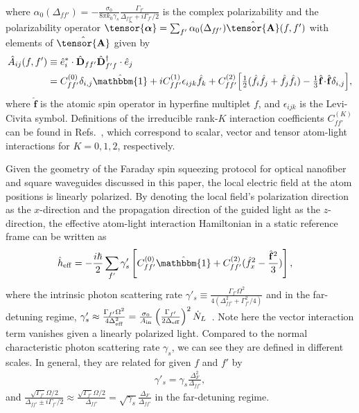 \documentclass[preprint,aps,pra,onecolumn,superscriptaddress]{revtex4-1} %
\newcommand{\smallfrac}[2]{\mbox{$\frac{#1}{#2}$}}
\newcommand{\poltens}{\hat{\tensor{\boldsymbol{\alpha}}}}
\newcommand{\charpol}{\alpha_0(\Delta_{f\!f'})}
\newcommand{\Ain}{A_{\rm in}}
\begin{document}
\begin{appendix}
\begin{align}
\end{align}
where $\charpol = -\frac{\sigma_0}{8\pi k_0\gamma_s}\frac{\Gamma_{f'}}{\Delta_{ff'}+i\Gamma_{f'}/2}$ is the complex polarizability and the polarizability operator $  \poltens=\sum_{f'}\charpol\hat{\tensor{\mathbf{A}}}(f,f')$ with elements of $ \hat{\tensor{\mathbf{A}}} $ given by
\begin{align} \label{Eq::PolarizabilityIrrep}
		\hat{A}_{ij}(f,f')&\equiv \hat{e}_i^*\cdot\hat{\mathbf{D}}_{ff'}\hat{\mathbf{D}}_{f'f}^\dagger \cdot \hat{e}_j \\
		&=  C_{ff'}^{(0)} \delta_{i,j}\hat{\mathbbm{1}}+ iC_{ff'}^{(1)}\epsilon_{ijk}\hat{f}_k+ C_{ff'}^{(2)} \Big[ \smallfrac{1}{2} ( \hat{f}_i\hat{f}_j +\hat{f}_j\hat{f}_i )-\smallfrac{1}{3} \hat{\mathbf{f}}\!\cdot\!\hat{\mathbf{f}} \delta_{i,j} \Big], 
\end{align}
where $\hat{\mathbf{f}}$ is the atomic spin operator in hyperfine multiplet $f$, and $ \epsilon_{ijk} $ is the Levi-Civita symbol. 
Definitions of the irreducible rank-$ K $ interaction coefficients $ C_{ff'}^{(K)} $ can be found in Refs.~\cite{Qi2016,Deutsch2010a}, which correspond to scalar, vector and tensor atom-light interactions for $ K=0,1,2 $, respectively.

Given the geometry of the Faraday spin squeezing protocol for optical nanofiber and square waveguides discussed in this paper, the local electric field at the atom positions is linearly polarized. 
By denoting the local field's polarization direction as the $ x$-direction and the propagation direction of the guided light as the $ z $-direction, the effective atom-light interaction Hamiltonian in a static reference frame can be written as 
\begin{align}
\hat{h}_{\rm eff} &= -\frac{i\hbar}{2}\sum_{f'} \gamma'_s \left[C_{ff'}^{(0)}\hat{\mathbbm{1}}+C_{ff'}^{(2)}(\hat{f}_{x}^2-\frac{\hat{\mathbf{f}}^2}{3} ) \right],
\end{align}
where the intrinsic photon scattering rate $ \gamma'_s\equiv \frac{\Gamma_{f'}\Omega^2}{4(\Delta_{ff'}^2+\Gamma_{f'}^2/4 )}$ and in the far-detuning regime, $\gamma'_s \approx \frac{\Gamma_{f'}\Omega^2}{4\Delta_{\rm eff}^2}=\frac{\sigma_0}{\Ain}\left(\frac{\Gamma_{f'}}{2\Delta_{\rm eff}} \right)^2\dot{N}_L $~\cite{Deutsch2010a}. Note here the vector interaction term vanishes given a linearly polarized light.
Compared to the normal characteristic photon scattering rate $ \gamma_s $, we can see they are defined in different scales.
In general, they are related for given $ f $ and $ f' $ by 
\begin{align}
\gamma'_s=\gamma_s \frac{\Delta_F^2}{\Delta_{ff'}},
\end{align}
and $ \frac{\sqrt{\Gamma_{f'}}\Omega/2}{\Delta_{ff'}\pm i\Gamma_{f'}/2}\approx \frac{\sqrt{\Gamma_{f'}}\Omega/2}{\Delta_{ff'}}=\sqrt{\gamma_s}\frac{\Delta_F}{\Delta_{ff'}} $ in the far-detuning regime.


\end{appendix}
\end{document}
